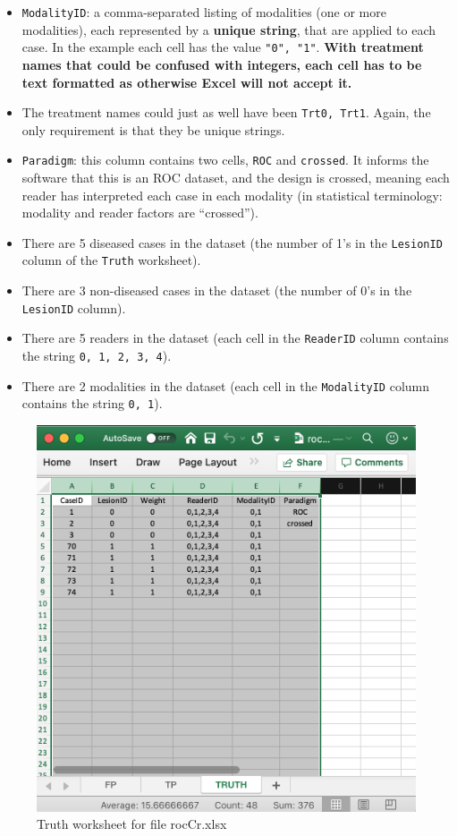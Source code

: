 \documentclass[]{book}
\begin{document}
\begin{itemize}
\item
  \texttt{ModalityID}: a comma-separated listing of modalities (one or more modalities), each represented by a \textbf{unique string}, that are applied to each case. In the example each cell has the value \texttt{"0",\ "1"}. \textbf{With treatment names that could be confused with integers, each cell has to be text formatted as otherwise Excel will not accept it.}
\item
  The treatment names could just as well have been \texttt{Trt0,\ Trt1}. Again, the only requirement is that they be unique strings.
\item
  \texttt{Paradigm}: this column contains two cells, \texttt{ROC} and \texttt{crossed}. It informs the software that this is an ROC dataset, and the design is crossed, meaning each reader has interpreted each case in each modality (in statistical terminology: modality and reader factors are ``crossed'').
\item
  There are 5 diseased cases in the dataset (the number of 1's in the \texttt{LesionID} column of the \texttt{Truth} worksheet).
\item
  There are 3 non-diseased cases in the dataset (the number of 0's in the \texttt{LesionID} column).
\item
  There are 5 readers in the dataset (each cell in the \texttt{ReaderID} column contains the string \texttt{0,\ 1,\ 2,\ 3,\ 4}).
\item
  There are 2 modalities in the dataset (each cell in the \texttt{ModalityID} column contains the string \texttt{0,\ 1}).
\end{itemize}

\begin{figure}

{\centering \includegraphics[width=0.5\linewidth,height=0.2\textheight]{images/rocCrTruth} 

}

\caption{Truth worksheet for file rocCr.xlsx}\label{fig:showRocCrTruthSheet}
\end{figure}
\end{document}
